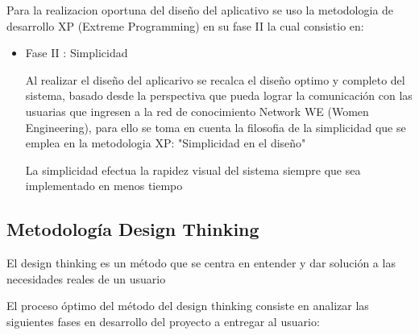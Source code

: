 \documentclass[hidelinks]{Documento}
\begin{document}
Para la realizacion oportuna del diseño del aplicativo se uso la metodologia de desarrollo XP (Extreme Programming) en su fase II la cual consistio en:

\begin{itemize}
    \item Fase II : Simplicidad

    Al realizar el diseño del aplicarivo se recalca el diseño optimo y completo del sistema, basado desde la perspectiva que pueda lograr la comunicación con las usuarias que ingresen a la red de conocimiento Network WE (Women Engineering), para ello se toma en cuenta la filosofia de la simplicidad que se emplea en la metodologia XP: "Simplicidad en el diseño"

    La simplicidad efectua la rapidez visual del sistema siempre que sea implementado en menos tiempo  

\end{itemize}

\subsection{Metodología Design Thinking}

El design thinking es un método que se centra en entender y dar solución a las necesidades reales de un usuario

El proceso óptimo del método del design thinking consiste en analizar las siguientes fases en desarrollo del proyecto a entregar al usuario:
\end{document}
